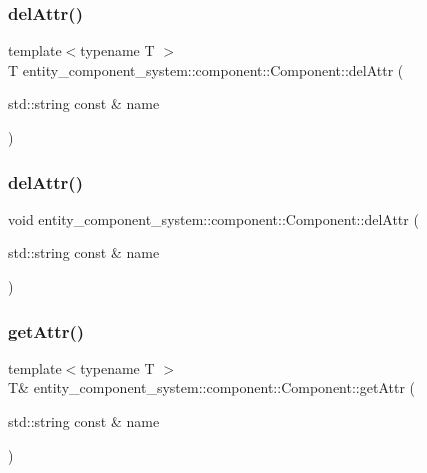 \subsubsection{del\+Attr()\hspace{0.1cm}{\footnotesize\ttfamily [1/2]}}
{\footnotesize\ttfamily template$<$typename T $>$ \\
T entity\+\_\+component\+\_\+system\+::component\+::\+Component\+::del\+Attr (\begin{DoxyParamCaption}\item[{std\+::string const \&}]{name }\end{DoxyParamCaption})\hspace{0.3cm}{\ttfamily [inline]}}

\label{classentity__component__system_1_1component_1_1_component_a2975cbb2038ee0de41fd593528a84687} 
\subsubsection{del\+Attr()\hspace{0.1cm}{\footnotesize\ttfamily [2/2]}}
{\footnotesize\ttfamily void entity\+\_\+component\+\_\+system\+::component\+::\+Component\+::del\+Attr (\begin{DoxyParamCaption}\item[{std\+::string const \&}]{name }\end{DoxyParamCaption})\hspace{0.3cm}{\ttfamily [inline]}}

\label{classentity__component__system_1_1component_1_1_component_adf16101ac90dc84d606a2b0abc69f65c} 
\subsubsection{get\+Attr()\hspace{0.1cm}{\footnotesize\ttfamily [1/2]}}
{\footnotesize\ttfamily template$<$typename T $>$ \\
T\& entity\+\_\+component\+\_\+system\+::component\+::\+Component\+::get\+Attr (\begin{DoxyParamCaption}\item[{std\+::string const \&}]{name }\end{DoxyParamCaption})\hspace{0.3cm}{\ttfamily [inline]}}

